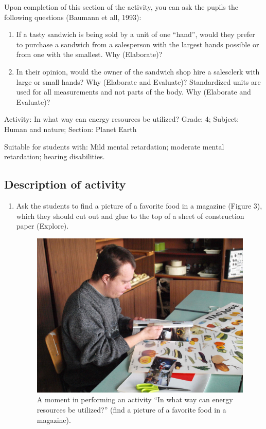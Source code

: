 \documentclass[11.5pt]{sig-alternate} %
\begin{document}
\begin{large}
Upon completion of this section of the activity, you can ask the pupils the following questions (Baumann et all, 1993):

\begin{enumerate}
    \item If a tasty sandwich is being sold by a unit of one “hand”, would they prefer to purchase a sandwich from a salesperson with the largest hands possible or from one with the smallest. Why (Elaborate)?
    \item In their opinion, would the owner of the sandwich shop hire a salesclerk with large or small hands? Why (Elaborate and Evaluate)? Standardized units are used for all measurements and not parts of the body. Why (Elaborate and Evaluate)?
\end{enumerate}

Activity: In what way can energy resources be utilized? Grade: 4; Subject: Human and nature; Section: Planet Earth

Suitable for students with: Mild mental retardation; moderate mental retardation; hearing disabilities.

\subsection*{Description of activity}

\begin{enumerate}
    \item Ask the students to find a picture of a favorite food in a magazine (Figure 3), which they should cut out and glue to the top of a sheet of construction paper (Explore).

\begin{figure}[h]
    \centering
    \includegraphics[width=0.95\linewidth]{images/fig3.jpg}
    \caption{A moment in performing an activity “In what way can energy resources be utilized?” (find a picture of a favorite food in a magazine).}
\end{figure}


\end{enumerate}
\end{large}
\end{document}
